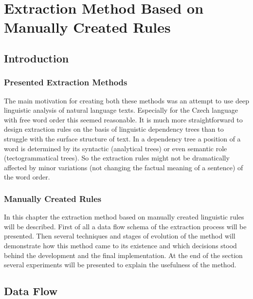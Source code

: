 \chapter{Extraction Method Based on Manually Created Rules} \label{sec:ch50_manual_rules_chapter}
\graphicspath{{../img/ch50/}}

\section{Introduction}

\subsection{Presented Extraction Methods}

The main motivation for creating both these methods was an attempt to use deep linguistic analysis of natural language texts. Especially for the Czech language with free word order this seemed reasonable. It is much more straightforward to design extraction rules on the basis of linguistic dependency trees than to struggle with the surface structure of text. In a dependency tree a position of a word is determined by its syntactic (analytical trees) or even semantic role (tectogrammatical trees). So the extraction rules might not be dramatically affected by minor variations (not changing the factual meaning of a sentence) of the word order.


\subsection{Manually Created Rules}
In this chapter the extraction method based on manually created linguistic rules will be described. First of all a data flow schema of the extraction process will be presented. Then several techniques and stages of evolution of the method will demonstrate how this method came to its existence and which decisions stood behind the development and the final implementation. At the end of the section several experiments will be presented to explain the usefulness of the method. 


\section{Data Flow} \label{sec:ch50_data_flow}

